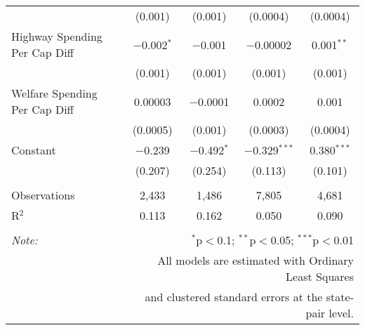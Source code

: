 \begin{table}[!htbp]
\begin{tabular}{@{\extracolsep{5pt}}lcccc}
  & (0.001) & (0.001) & (0.0004) & (0.0004) \\ 
  Highway Spending Per Cap Diff & $-$0.002$^{*}$ & $-$0.001 & $-$0.00002 & 0.001$^{**}$ \\ 
  & (0.001) & (0.001) & (0.001) & (0.001) \\ 
  Welfare Spending Per Cap Diff & 0.00003 & $-$0.0001 & 0.0002 & 0.001 \\ 
  & (0.0005) & (0.001) & (0.0003) & (0.0004) \\ 
  Constant & $-$0.239 & $-$0.492$^{*}$ & $-$0.329$^{***}$ & 0.380$^{***}$ \\ 
  & (0.207) & (0.254) & (0.113) & (0.101) \\ 
 \hline \\[-1.8ex] 
Observations & 2,433 & 1,486 & 7,805 & 4,681 \\ 
R$^{2}$ & 0.113 & 0.162 & 0.050 & 0.090 \\ 
\hline 
\hline \\[-1.8ex] 
\textit{Note:}  & \multicolumn{4}{r}{$^{*}$p$<$0.1; $^{**}$p$<$0.05; $^{***}$p$<$0.01} \\ 
 & \multicolumn{4}{r}{All models are estimated with Ordinary Least Squares} \\ 
 & \multicolumn{4}{r}{and clustered standard errors at the state-pair level.} \\ 
\end{tabular} 
\end{table} 
